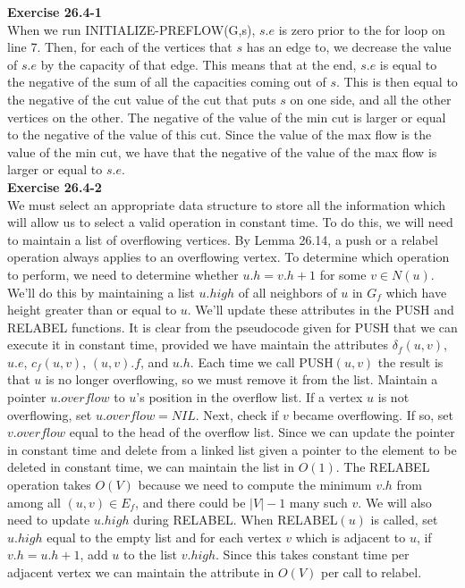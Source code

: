 \documentclass{article}
\begin{document}
\noindent\textbf{Exercise 26.4-1}\\

When we run INITIALIZE-PREFLOW(G,s), $s.e$ is zero prior to the for loop on line 7. Then, for each of the vertices that $s$ has an edge to, we decrease the value of $s.e$ by the capacity of that edge. This means that at the end, $s.e$ is equal to the negative of the sum of all the capacities coming out of $s$. This is then equal to the negative of the cut value of the cut that puts $s$ on one side, and all the other vertices on the other. The negative of the value of the min cut is larger or equal to the negative of the value of this cut. Since the value of the max flow is the value of the min cut, we have that the negative of the value of the max flow is larger or equal to $s.e$.\\


\noindent\textbf{Exercise 26.4-2}\\

We must select an appropriate data structure to store all the information which will allow us to select a valid operation in constant time.  To do this, we will need to maintain a list of overflowing vertices.  By Lemma 26.14, a push or a relabel operation always applies to an overflowing vertex.  To determine which operation to perform, we need to determine whether $u.h = v.h+1$ for some $v \in N(u)$.  We'll do this by maintaining a list $u.high$ of all neighbors of $u$ in $G_f$ which have height greater than or equal to $u$.   We'll update these attributes in the PUSH and RELABEL functions.  It is clear from the pseudocode given for PUSH that we can execute it in constant time, provided we have maintain the attributes $\delta_f(u,v)$, $u.e$, $c_f(u,v)$, $(u,v).f$, and $u.h$.  Each time we call PUSH$(u,v)$ the result is that $u$ is no longer overflowing, so we must remove it from the list.  Maintain a pointer $u.overflow$ to $u$'s position in the overflow list.  If a vertex $u$ is not overflowing, set $u.overflow = NIL$.  Next, check if $v$ became overflowing.   If so, set $v.overflow$ equal to the head of the overflow list. Since we can update the pointer in constant time and delete from a linked list given a pointer to the element to be deleted in constant time, we can maintain the list in $O(1)$.  The RELABEL operation takes $O(V)$ because we need to compute the minimum $v.h$ from among all $(u,v) \in E_f$, and there could be $|V|-1$ many such $v$. We will also need to update $u.high$ during RELABEL.  When RELABEL$(u)$ is called, set $u.high$ equal to the empty list and for each vertex $v$ which is adjacent to $u$, if $v.h = u.h + 1$, add $u$ to the list $v.high$.  Since this takes constant time per adjacent vertex we can maintain the attribute in $O(V)$ per call to relabel.\\
\end{document}
